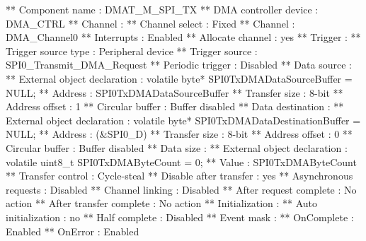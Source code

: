 \begin{DoxyCode}
**          Component name                                 : DMAT\_M\_SPI\_TX
**          DMA controller device                          : DMA\_CTRL
**          Channel                                        : 
**            Channel select                               : Fixed
**              Channel                                    : DMA\_Channel0
**              Interrupts                                 : Enabled
**              Allocate channel                           : yes
**          Trigger                                        : 
**            Trigger source type                          : Peripheral device
**              Trigger source                             : SPI0\_Transmit\_DMA\_Request
**              Periodic trigger                           : Disabled
**          Data source                                    : 
**            External \textcolor{keywordtype}{object} declaration                  : \textcolor{keyword}{volatile} byte* SPI0TxDMADataSourceBuffer = 
      NULL;
**            Address                                      : SPI0TxDMADataSourceBuffer
**            Transfer size                                : 8-bit
**            Address offset                               : 1
**            Circular buffer                              : Buffer disabled
**          Data destination                               : 
**            External \textcolor{keywordtype}{object} declaration                  : \textcolor{keyword}{volatile} byte* SPI0TxDMADataDestinationBuffer 
      = NULL;
**            Address                                      : (&SPI0\_D)
**            Transfer size                                : 8-bit
**            Address offset                               : 0
**            Circular buffer                              : Buffer disabled
**          Data size                                      : 
**            External \textcolor{keywordtype}{object} declaration                  : \textcolor{keyword}{volatile} uint8\_t SPI0TxDMAByteCount = 0;
**            Value                                        : SPI0TxDMAByteCount
**          Transfer control                               : Cycle-steal
**            Disable after transfer                       : yes
**            Asynchronous requests                        : Disabled
**            Channel linking                              : Disabled
**            After request complete                       : No action
**            After transfer complete                      : No action
**          Initialization                                 : 
**            Auto initialization                          : no
**            Half complete                                : Disabled
**            Event mask                                   : 
**              OnComplete                                 : Enabled
**              OnError                                    : Enabled
\end{DoxyCode}
